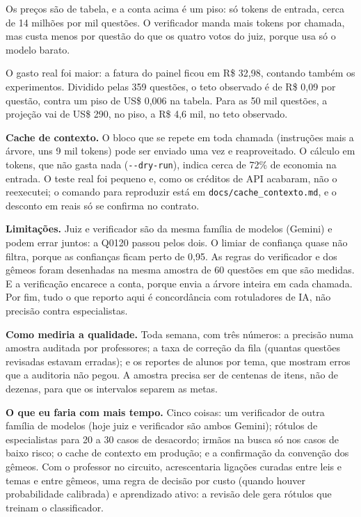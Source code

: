 \documentclass[11pt,a4paper]{article}
\newcommand{\bd}[1]{\textbf{#1}}
\begin{document}
Os preços são de tabela, e a conta acima é um piso: só tokens de entrada, cerca de 14 milhões
por mil questões. O verificador manda mais tokens por chamada, mas custa menos por questão do
que os quatro votos do juiz, porque usa só o modelo barato.

O gasto real foi maior: a fatura do painel ficou em R\$ 32,98, contando também os
experimentos. Dividido pelas 359 questões, o teto observado é de R\$ 0,09 por questão, contra
um piso de US\$ 0,006 na tabela. Para as 50 mil questões, a projeção vai de US\$ 290, no piso,
a R\$ 4,6 mil, no teto observado.

\bd{Cache de contexto.} O bloco que se repete em toda chamada (instruções mais a árvore, uns
9 mil tokens) pode ser enviado uma vez e reaproveitado. O cálculo em tokens, que não gasta
nada (\texttt{-{}-dry-run}), indica cerca de 72\% de economia na entrada. O teste real foi
pequeno e, como os créditos de API acabaram, não o reexecutei; o comando para reproduzir está
em \texttt{docs/cache\_contexto.md}, e o desconto em reais só se confirma no contrato.

\bd{Limitações.} Juiz e verificador são da mesma família de modelos
(Gemini) e podem errar juntos: a Q0120 passou pelos dois. O limiar de confiança quase não
filtra, porque as confianças ficam perto de 0,95. As regras do verificador e dos gêmeos foram
desenhadas na mesma amostra de 60 questões em que são medidas. E a verificação encarece a
conta, porque envia a árvore inteira em cada chamada. Por fim, tudo o que reporto aqui é
concordância com rotuladores de IA, não precisão contra especialistas.

\bd{Como mediria a qualidade.} Toda semana, com três números: a precisão numa amostra auditada
por professores; a taxa de correção da fila (quantas questões revisadas estavam erradas); e os
reportes de alunos por tema, que mostram erros que a auditoria não pegou. A amostra precisa
ser de centenas de itens, não de dezenas, para que os intervalos separem as metas.

\bd{O que eu faria com mais tempo.} Cinco coisas: um verificador de outra família de modelos
(hoje juiz e verificador são ambos Gemini); rótulos de especialistas para 20 a 30 casos de
desacordo; irmãos na busca só nos casos de baixo risco; o cache de contexto em produção; e a
confirmação da convenção dos gêmeos. Com o professor no circuito, acrescentaria ligações
curadas entre leis e temas e entre gêmeos, uma regra de decisão por custo (quando houver
probabilidade calibrada) e aprendizado ativo: a revisão dele gera rótulos que treinam o
classificador.
\end{document}
